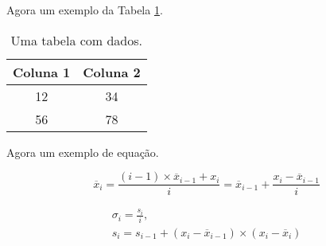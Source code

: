 \lipsum[2-4]	
\lipsum[2-4]	


Agora um exemplo da Tabela \ref{tab:tabela}.

\begin{table}[H] %
	\centering
	\caption{Uma tabela com dados.}
	\label{tab:tabela}
	\begin{tabular}{|c|c|}
		\hline
		Coluna 1 & Coluna 2 \\
		\hline
		12 & 34 \\
		56 & 78 \\
		\hline	
	\end{tabular}
\end{table}

Agora um exemplo de equação.

\begin{equation}
    \overline{x}_i = \frac{(i-1) \times \overline{x}_{i-1} + x_i}{i} =  \overline{x}_{i-1} + \frac{x_i - \overline{x}_{i-1}}{i}
    \label{eq:mean_incremental}
\end{equation}


\begin{equation}  
\begin{gathered} 
 \sigma_{i} = \frac{s_i}{i}, \\
 s_i = s_{i - 1} + (x_{i} -  \overline{x}_{i-1}) \times (x_{i} -  \overline{x}_{i})
\end{gathered}
\label{eq:var_incremental}
\end{equation}

\lipsum[2-4]	
\lipsum[2-4]	

